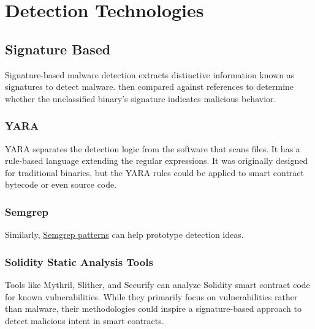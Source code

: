 \section{Detection Technologies} \label{sec:detection-technologies}

\subsection{Signature Based}

Signature-based malware detection extracts distinctive information known as signatures to detect malware.
then compared against references to determine whether the unclassified binary’s signature indicates malicious behavior.

\subsubsection{YARA}

YARA separates the detection logic from the software that scans files.
It has a rule-based language extending the regular expressions.
It was originally designed for traditional binaries, but the YARA rules could be applied to smart contract bytecode or even source code.

\subsubsection{Semgrep}

Similarly, \href{https://semgrep.dev/r?&lang=Solidity}{Semgrep patterns} can help prototype detection ideas.

\subsubsection{Solidity Static Analysis Tools}

Tools like Mythril, Slither, and Securify can analyze Solidity smart contract code for known vulnerabilities.
While they primarily focus on vulnerabilities rather than malware, their methodologies could inspire a signature-based approach to detect malicious intent in smart contracts.
